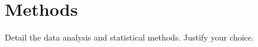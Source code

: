 \chapter{Methods}
\label{sec:methods}

Detail the data analysis and statistical methods. Justify your choice.